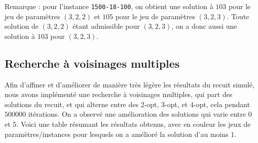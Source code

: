 \documentclass[12pt]{article}
\begin{document}
Remarque : pour l'instance \texttt{1500-18-100}, on obtient une solution à $103$ pour le jeu de paramètres $(3, 2, 2)$ et $105$ pour le jeu de paramètres $(3, 2, 3)$. Toute solution de $(3, 2, 2)$ étant admissible pour $(3, 2, 3)$, on a donc aussi une solution à $103$ pour $(3, 2, 3)$.

\subsection{Recherche à voisinages multiples}

Afin d'affiner et d'améliorer de manière très légère les résultats du recuit simulé, nous avons implémenté une recherche à voisinages multiples, qui part des solutions du recuit, et qui alterne entre des 2-opt, 3-opt, et 4-opt, cela pendant $500000$ itérations. On a observé une amélioration des solutions qui varie entre $0$ et $5$. Voici une table résumant les résultats obtenus, avec en couleur les jeux de paramètres/instances pour lesquels on a amélioré la solution d'au moins $1$.
\end{document}
